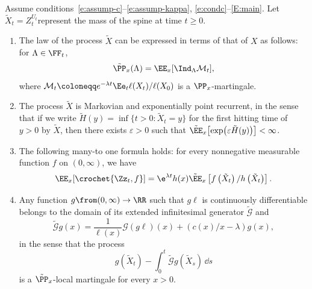 \begin{lemm}\label{L20}
Assume conditions~\eqref{e:assump-c}--\eqref{e:assump-kappa}, \eqref{e:condc}--\eqref{E:main}. Let $\tilde X_t=Z^{U_t}_t$\linebreak represent the mass of the spine at time $t\geq 0$.
\begin{enumerate}
\item \label{list4.4.1}The law of the process $\tilde{X}$ can be expressed in terms of that of $X$ as follows: for $\Lambda \in \FF_t$,
\[
\tilde{\PP}_x(\Lambda) = \EE_x[\Ind_{\Lambda} \mathcal{M}_t],
\]
where $\mathcal{M}_t \coloneqq e^{-\lambda t} \Ee_t \ell(X_t)/\ell(X_0)$ is a $\PP_x$-martingale.

\item \label{list4.4.2}The process $\tilde X$ is Markovian and exponentially point recurrent, in the sense that if we write $\tilde H(y) =\inf\{t>0: \tilde X_t=y\}$ for the first hitting time of $y>0$ by $\tilde X$, then there exists $\varepsilon>0$ such that $\tilde{\EE}_x\bigl[\exp\bigl(\varepsilon \tilde H(y)\bigr)\bigr] <\infty$.

\item \label{list4.4.3}The following many-to one formula holds: for every nonnegative measurable function $f$ on $(0,\infty)$, we have
\begin{equation}\label{e:mtoY}
\EE_x[\crochet{\Zz_t, f}]=\e^{\lambda t} h(x)\tilde \EE_x\left[f\left(\tilde X_t\right)/h\left(\tilde X_t\right)\right].
\end{equation}

\item \label{list4.4.4}Any function $g\from (0,\infty)\to \RR$ such that $g\ell$ is continuously differentiable belongs to the domain of its extended infinitesimal generator $\tilde {\mathcal G}$ and
\begin{equation}\label{E:genY}
\tilde {\mathcal G}g(x) = \frac{1}{\ell(x)} {\mathcal G}(g\ell)(x) +(c(x)/x- \lambda) g(x),
\end{equation}
in the sense that the process
\[
g\left(\tilde X_t\right)-\int_0^t \tilde {\mathcal G}g\left(\tilde X_s\right) \, \dd s
\]
is a $\tilde \PP_x$-local martingale for every $x>0$.
\end{enumerate}
\end{lemm}
